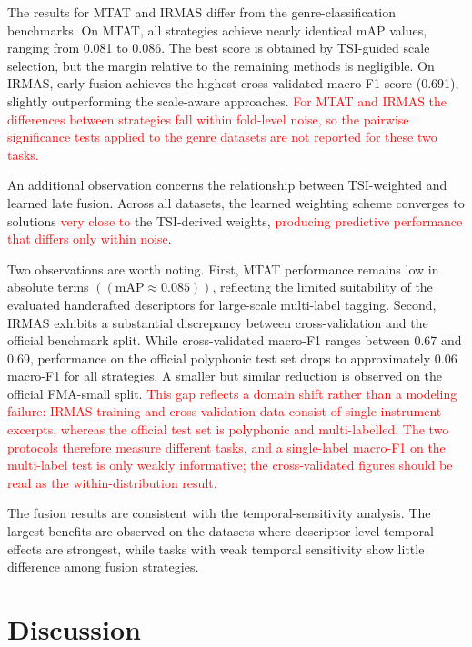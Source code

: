 \documentclass[runningheads]{llncs}
\begin{document}
The results for MTAT and IRMAS differ from the genre-classification benchmarks. On MTAT, all strategies achieve nearly identical mAP values, ranging from 0.081 to 0.086. The best score is obtained by TSI-guided scale selection, but the margin relative to the remaining methods is negligible. On IRMAS, early fusion achieves the highest cross-validated macro-F1 score (0.691), slightly outperforming the scale-aware approaches. \textcolor{red}{For MTAT and IRMAS the differences between strategies fall within fold-level noise, so the pairwise significance tests applied to the genre datasets are not reported for these two tasks.}

An additional observation concerns the relationship between TSI-weighted and learned late fusion. Across all datasets, the learned weighting scheme converges to solutions \textcolor{red}{very close to} the TSI-derived weights, \textcolor{red}{producing predictive performance that differs only within noise}.

Two observations are worth noting. First, MTAT performance remains low in absolute terms $((\text{mAP}\approx0.085))$, reflecting the limited suitability of the evaluated handcrafted descriptors for large-scale multi-label tagging. Second, IRMAS exhibits a substantial discrepancy between cross-validation and the official benchmark split. While cross-validated macro-F1 ranges between 0.67 and 0.69, performance on the official polyphonic test set drops to approximately 0.06 macro-F1 for all strategies. A smaller but similar reduction is observed on the official FMA-small split. \textcolor{red}{This gap reflects a domain shift rather than a modeling failure: IRMAS training and cross-validation data consist of single-instrument excerpts, whereas the official test set is polyphonic and multi-labelled. The two protocols therefore measure different tasks, and a single-label macro-F1 on the multi-label test is only weakly informative; the cross-validated figures should be read as the within-distribution result.}

The fusion results are consistent with the temporal-sensitivity analysis. The largest benefits are observed on the datasets where descriptor-level temporal effects are strongest, while tasks with weak temporal sensitivity show little difference among fusion strategies.

\section{Discussion}
\label{sec:discussion}
\end{document}

